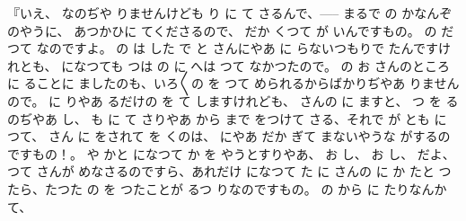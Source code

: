 『いえ、
なのぢや
りませんけども
り
に
て
さるんで、\------ まるで
の
かなんぞのやうに、
あつかひに
てくださるので、
だか
くつて
が
いんですもの。
の
だつて
なのですよ。
の
は
した
で
と
さんにやあ
に
らないつもりで
たんですけれとも、
になつても
つは
の
に
へは
つて
なかつたので。
の
お
さんのところに
ることに
ましたのも、いろ〳〵の
を
つて
められるからばかりぢやあ
りませんので。
に
りやあ
るだけの
を
て
しますけれども、
さんの
に
ますと、
つ
を
るのぢやあ
し、
も
に
て
さりやあ
から
まで
をつけて
さる、それで
が
とも
に
つて、
さん
に
をされて
を
くのは、
にやあ
だか
ぎて
まないやうな
がするのですもの！。
や
かと
になつて
か
を
やうとすりやあ、
お
し、
お
し、
だよ、つて
さんが
めなさるのですら、あれだけ
になつて
た
に
さんの
に
か
たと
つたら、たつた
の
を
つたことが
るつ
りなのですもの。
の
から
に
たりなんか
て、
